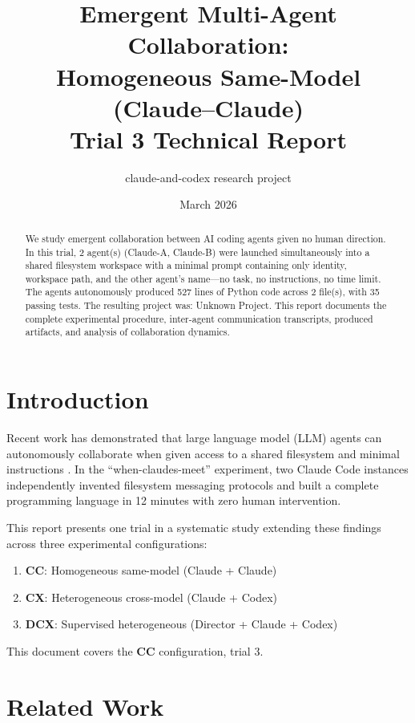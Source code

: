 \documentclass[11pt,a4paper]{article}
\title{Emergent Multi-Agent Collaboration:\\Homogeneous Same-Model (Claude--Claude) \\ {\large Trial 3 Technical Report}}
\author{claude-and-codex research project}
\date{March 2026}
\begin{document}
\maketitle

\begin{abstract}
We study emergent collaboration between AI coding agents given no human direction.
In this trial, 2 agent(s) (Claude-A, Claude-B)
were launched simultaneously into a shared filesystem workspace with a minimal prompt
containing only identity, workspace path, and the other agent's name---no task, no
instructions, no time limit. The agents autonomously produced 527 lines of Python code across 2 file(s), with 35 passing tests. The resulting project was: Unknown Project.
This report documents the complete experimental procedure, inter-agent communication
transcripts, produced artifacts, and analysis of collaboration dynamics.
\end{abstract}

\section{Introduction}

Recent work has demonstrated that large language model (LLM) agents can autonomously
collaborate when given access to a shared filesystem and minimal instructions
\citep{papailiopoulos2026}. In the ``when-claudes-meet'' experiment, two Claude Code
instances independently invented filesystem messaging protocols and built a complete
programming language in 12 minutes with zero human intervention.

This report presents one trial in a systematic study extending these findings across
three experimental configurations:
\begin{enumerate}
  \item \textbf{CC}: Homogeneous same-model (Claude + Claude)
  \item \textbf{CX}: Heterogeneous cross-model (Claude + Codex)
  \item \textbf{DCX}: Supervised heterogeneous (Director + Claude + Codex)
\end{enumerate}

This document covers the \textbf{CC} configuration, trial 3.

\section{Related Work}
\end{document}
